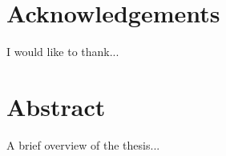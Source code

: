 \documentclass[12pt,a4paper]{report}
\begin{document}
\chapter*{Acknowledgements}

I would like to thank...

\chapter*{Abstract}

A brief overview of the thesis...

\tableofcontents{}

\listoffigures{}

\newpage


\newpage


\newpage


\newpage


\newpage


\newpage
\appendix




\end{document}
